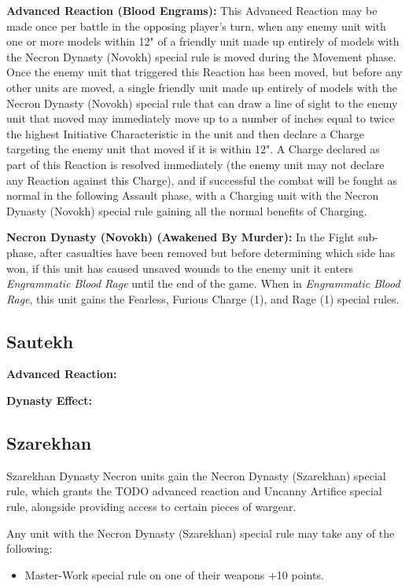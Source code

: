 \textbf{Advanced Reaction (Blood Engrams):} This Advanced Reaction may be made once per battle in the opposing player’s turn, when any enemy unit with one or more models within 12" of a friendly unit made up entirely of models with the Necron Dynasty (Novokh) special rule is moved during the Movement phase. Once the enemy unit that triggered this Reaction has been moved, but before any other units are moved, a single friendly unit made up entirely of models with the Necron Dynasty (Novokh) special rule that can draw a line of sight to the enemy unit that moved may immediately move up to a number of inches equal to twice the highest Initiative Characteristic in the unit and then declare a Charge targeting the enemy unit that moved if it is within 12". A Charge declared as part of this Reaction is resolved immediately (the enemy unit may not declare any Reaction against this Charge), and if successful the combat will be fought as normal in the following Assault phase, with a Charging unit with the Necron Dynasty (Novokh) special rule gaining all the normal benefits of Charging.

\textbf{Necron Dynasty (Novokh) (Awakened By Murder):} In the Fight sub-phase, after casualties have been removed but before determining which side has won, if this unit has caused unsaved wounds to the enemy unit it enters \textit{Engrammatic Blood Rage} until the end of the game. When in \textit{Engrammatic Blood Rage}, this unit gains the Fearless, Furious Charge (1), and Rage (1) special rules.

\subsection{Sautekh}


\textbf{Advanced Reaction:}

\textbf{Dynasty Effect:}


\subsection{Szarekhan}

Szarekhan Dynasty Necron units gain the Necron Dynasty (Szarekhan) special rule, which grants the TODO advanced reaction and Uncanny Artifice special rule, alongside providing access to certain pieces of wargear.

Any unit with the Necron Dynasty (Szarekhan) special rule may take any of the following:
\begin{itemize}
	\item Master-Work special rule on one of their weapons \dotfill +10 points.
\end{itemize}

